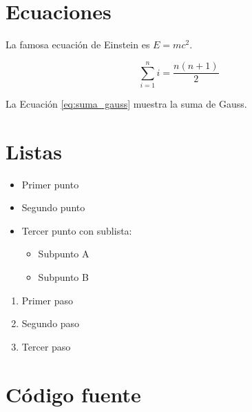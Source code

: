 \section{Ecuaciones}
\label{sec:ecuaciones}


La famosa ecuación de Einstein es $E = mc^2$.

\begin{equation}
    \sum_{i=1}^{n} i = \frac{n(n+1)}{2}
    \label{eq:suma_gauss}
\end{equation}

La Ecuación \ref{eq:suma_gauss} muestra la suma de Gauss.


\section{Listas}
\label{sec:listas}


\begin{itemize}
    \item Primer punto
    \item Segundo punto
    \item Tercer punto con sublista:
    \begin{itemize}
        \item Subpunto A
        \item Subpunto B
    \end{itemize}
\end{itemize}

\begin{enumerate}
    \item Primer paso
    \item Segundo paso
    \item Tercer paso
\end{enumerate}


\section{Código fuente}
\label{sec:codigo}

%
%


